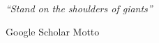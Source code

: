 \pagestyle{empty}  %

\null\vfill
\textit{``Stand on the shoulders of giants''}

\begin{flushright}
Google Scholar Motto
\end{flushright}

\vfill\vfill\vfill\vfill\vfill\vfill\null
\clearpage  %
